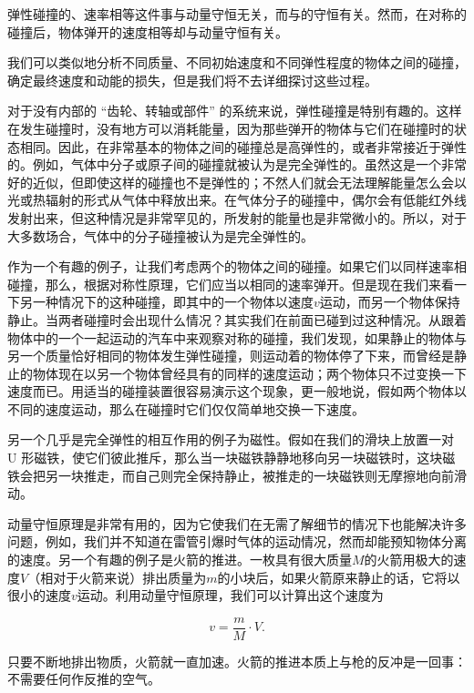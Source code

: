 \documentclass[12pt,oneside]{book}
\begin{document}
弹性碰撞的、速率相等这件事与动量守恒无关，而与的守恒有关。然而，在对称的碰撞后，物体弹开的速度相等却与动量守恒有关。

我们可以类似地分析不同质量、不同初始速度和不同弹性程度的物体之间的碰撞，确定最终速度和动能的损失，但是我们将不去详细探讨这些过程。

对于没有内部的 “齿轮、转轴或部件” 的系统来说，弹性碰撞是特别有趣的。这样在发生碰撞时，没有地方可以消耗能量，因为那些弹开的物体与它们在碰撞时的状态相同。因此，在非常基本的物体之间的碰撞总是高弹性的，或者非常接近于弹性的。例如，气体中分子或原子间的碰撞就被认为是完全弹性的。虽然这是一个非常好的近似，但即使这样的碰撞也不是弹性的；不然人们就会无法理解能量怎么会以光或热辐射的形式从气体中释放出来。在气体分子的碰撞中，偶尔会有低能红外线发射出来，但这种情况是非常罕见的，所发射的能量也是非常微小的。所以，对于大多数场合，气体中的分子碰撞被认为是完全弹性的。

作为一个有趣的例子，让我们考虑两个的物体之间的碰撞。如果它们以同样速率相碰撞，那么，根据对称性原理，它们应当以相同的速率弹开。但是现在我们来看一下另一种情况下的这种碰撞，即其中的一个物体以速度$v$运动，而另一个物体保持静止。当两者碰撞时会出现什么情况？其实我们在前面已碰到过这种情况。从跟着物体中的一个一起运动的汽车中来观察对称的碰撞，我们发现，如果静止的物体与另一个质量恰好相同的物体发生弹性碰撞，则运动着的物体停了下来，而曾经是静止的物体现在以另一个物体曾经具有的同样的速度运动；两个物体只不过变换一下速度而已。用适当的碰撞装置很容易演示这个现象，更一般地说，假如两个物体以不同的速度运动，那么在碰撞时它们仅仅简单地交换一下速度。

另一个几乎是完全弹性的相互作用的例子为磁性。假如在我们的滑块上放置一对 U 形磁铁，使它们彼此推斥，那么当一块磁铁静静地移向另一块磁铁时，这块磁铁会把另一块推走，而自己则完全保持静止，被推走的一块磁铁则无摩擦地向前滑动。

动量守恒原理是非常有用的，因为它使我们在无需了解细节的情况下也能解决许多问题，例如，我们并不知道在雷管引爆时气体的运动情况，然而却能预知物体分离的速度。另一个有趣的例子是火箭的推进。一枚具有很大质量$M$的火箭用极大的速度$V$（相对于火箭来说）排出质量为$m$的小块后，如果火箭原来静止的话，它将以很小的速度$v$运动。利用动量守恒原理，我们可以计算出这个速度为

\begin{equation*}
v=\frac{m}{M}\cdot V.
\end{equation*}

只要不断地排出物质，火箭就一直加速。火箭的推进本质上与枪的反冲是一回事：不需要任何作反推的空气。
\end{document}
